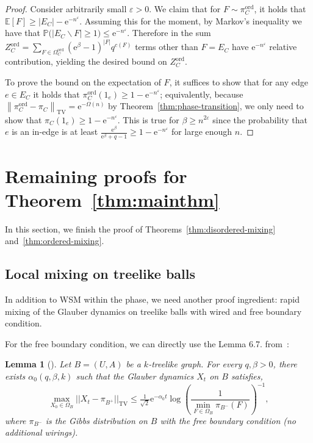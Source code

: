 \documentclass[11pt]{article}
\theoremstyle{plain}
\newtheorem{lemma}[theorem]{Lemma}
\let\epsilon=\varepsilon
\newcommand{\emm}{\mathrm{e}}
\newcommand{\E}{\mathds{E}}
\renewcommand{\P}{\mathds{P}}
\newcommand{\TV}{\mathrm{TV}}
\newcommand{\1}{\mathbb{1}}
\newcommand{\ord}{\mathrm{ord}}
\begin{document}
\betainf*
\begin{proof}
Consider arbitrarily small $\epsilon>0$. We claim that for $F\sim \pi^{\ord}_{C}$, it holds that $\E[F]\geq |E_C|- \emm^{-n^\epsilon}$. Assuming this for the moment, by Markov's inequality we have that $\P\big(|E_C\backslash F|\geq 1\big)\leq  \emm^{-n^\epsilon}$. Therefore in the sum $Z^{\ord}_{C}=\sum_{F\in \Omega^{\ord}_C} (\emm^{\beta}-1)^{|F|}q^{c(F)}$  terms other than $F=E_C$ have $\emm^{-n^\epsilon}$ relative contribution, yielding the desired bound on $Z^{\ord}_{C}$.

To prove the bound on the expectation of $F$, it suffices to show that for any edge $e\in E_C$ it holds that   $\pi^\ord_{C}(1_e)\geq 1-\emm^{-n^\epsilon}$; equivalently, because $\left\|\pi^\ord_C-\pi_C\right\|_\TV=\emm^{-\Omega(n)}$ by Theorem~\ref{thm:phase-transition}, we only need to show that $\pi_C(1_e)\geq 1-\emm^{-n^\epsilon}.$ This is true for $\beta\geq n^{2\epsilon}$ since the probability that $e$ is an  in-edge is at least  $\frac{\emm^{\beta}}{\emm^{\beta}+q-1}\geq  1-\emm^{-n^{\epsilon}}$ for large enough $n$. 
\end{proof}
\section{Remaining proofs for Theorem~\ref{thm:mainthm}} \label{sec:putting-ingredients-together}

In this section, we finish the proof of Theorems~\ref{thm:disordered-mixing} and~\ref{thm:ordered-mixing}.

\subsection{Local mixing on treelike balls}\label{sec:tree-mixing}

In addition to WSM within the phase, we need another proof ingredient: rapid mixing of the Glauber dynamics on treelike balls with wired and free boundary condition.

For the free boundary condition, we can directly use the Lemma 6.7. from~\cite{rcm-on-unbounded-degree-graphs}:

\begin{lemma}[{\cite[Lemma 6.7]{rcm-on-unbounded-degree-graphs}}]
    Let \(B = (U,A)\) be a \(k\)-treelike graph. For every \(q,\beta > 0\), there exists \(\alpha_0(q,\beta,k)\) such that the Glauber dynamics \(X_t\) on \(B\) satisfies,
    \[
    \max_{X_0\in\Omega_{B}} || X_t - \pi_{B^+} ||_\TV \leq \tfrac{1}{\sqrt 2} \emm^{-\alpha_0 t} \log\left(\frac{1}{\min_{F\in\Omega_B} \pi_{B^-}(F)}\right)^{-1},
    \]
    where \(\pi_{B^-}\) is the Gibbs distribution on \(B\) with the free boundary condition (no additional wirings).
\end{lemma}
\end{document}
